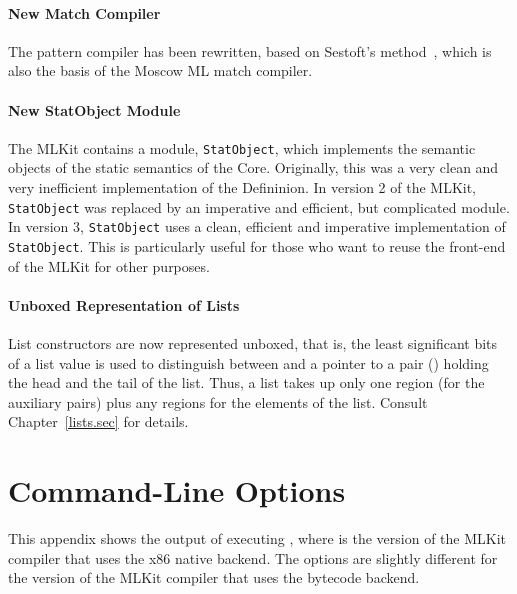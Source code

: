 \documentclass[12pt]{book}
\begin{document}
\subsubsection*{New Match Compiler}
The pattern compiler has been rewritten, based on Sestoft's 
method~\cite{sestoft96}, which is also the basis of the Moscow ML 
match compiler. 

\subsubsection*{New StatObject Module}
The MLKit contains a module, 
%
{\tt StatObject}, which implements the semantic objects of the static
semantics of the Core.  Originally, this was a very clean and very
inefficient implementation of the Defininion. In version 2 of the MLKit,
{\tt StatObject} was replaced by an imperative and efficient, but
complicated module.  In version 3, {\tt StatObject} uses a clean,
efficient and imperative implementation of {\tt StatObject}. This is
particularly useful for those who want to reuse the front-end of the
MLKit for other purposes.

\subsubsection*{Unboxed Representation of Lists}
 List constructors are now represented unboxed, that is,
the least significant bits of a list value is used to distinguish
between  and a pointer to a pair (\boxml{::}) holding the
head and the tail of the list. Thus, a list takes up only one region
(for the auxiliary pairs) plus any regions for the elements of the
list. Consult Chapter~\ref{lists.sec} for details.

\nocite{total97,total94,btv96,elshal95,KochHojfeld96,H96,hallenberg99,brtt93,hosc-regions2004}




\appendix

\chapter{Command-Line Options}
\label{mlkithelp.app}
This appendix shows the output of executing 
%
, where  is the version of the MLKit
compiler that uses the 
%
x86 native backend. The options are slightly different for the version
of the MLKit compiler that uses the bytecode backend.
\end{document}
